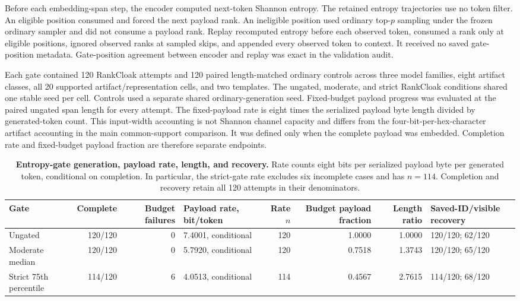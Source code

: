 \documentclass[fleqn,10pt]{wlscirep}
\begin{document}
Before each embedding-span step, the encoder computed next-token Shannon entropy. The retained entropy trajectories use no token filter. An eligible position consumed and forced the next payload rank. An ineligible position used ordinary top-\(p\) sampling under the frozen ordinary sampler and did not consume a payload rank. Replay recomputed entropy before each observed token, consumed a rank only at eligible positions, ignored observed ranks at sampled skips, and appended every observed token to context. It received no saved gate-position metadata. Gate-position agreement between encoder and replay was exact in the validation audit.

Each gate contained 120 RankCloak attempts and 120 paired length-matched ordinary controls across three model families, eight artifact classes, all 20 supported artifact/representation cells, and two templates. The ungated, moderate, and strict RankCloak conditions shared one stable seed per cell. Controls used a separate shared ordinary-generation seed. Fixed-budget payload progress was evaluated at the paired ungated span length for every attempt. The fixed-payload rate is eight times the serialized payload byte length divided by generated-token count. This input-width accounting is not Shannon channel capacity and differs from the four-bit-per-hex-character artifact accounting in the main common-support comparison. It was defined only when the complete payload was embedded. Completion rate and fixed-budget payload fraction are therefore separate endpoints.

\begin{table}[H]
\centering
\scriptsize
\setlength{\tabcolsep}{3pt}
\begin{tabularx}{\textwidth}{L{0.13\textwidth}r r L{0.18\textwidth}r r r Y}
\toprule
Gate & Complete & Budget failures & Payload rate, bit/token & Rate \(n\) & Budget payload fraction & Length ratio & Saved-ID/visible recovery \\
\midrule
Ungated & 120/120 & 0 & 7.4001, conditional & 120 & 1.0000 & 1.0000 & 120/120; 62/120 \\
Moderate median & 120/120 & 0 & 5.7920, conditional & 120 & 0.7518 & 1.3743 & 120/120; 65/120 \\
Strict 75th percentile & 114/120 & 6 & 4.0513, conditional & 114 & 0.4567 & 2.7615 & 114/120; 68/120 \\
\bottomrule
\end{tabularx}
\caption{\label{tab:v3-entropy-generation}\textbf{Entropy-gate generation, payload rate, length, and recovery.} Rate counts eight bits per serialized payload byte per generated token, conditional on completion. In particular, the strict-gate rate excludes six incomplete cases and has \(n=114\). Completion and recovery retain all 120 attempts in their denominators.}
\end{table}
\end{document}
